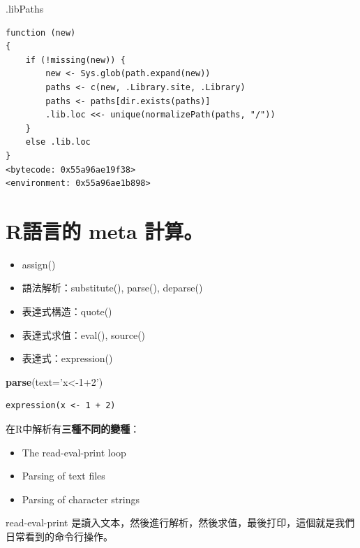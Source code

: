 \documentclass[]{book}
\newenvironment{Shaded}{\begin{snugshade}}{\end{snugshade}}
\newcommand{\DataTypeTok}[1]{\textcolor[rgb]{0.13,0.29,0.53}{#1}}
\newcommand{\KeywordTok}[1]{\textcolor[rgb]{0.13,0.29,0.53}{\textbf{#1}}}
\newcommand{\NormalTok}[1]{#1}
\newcommand{\StringTok}[1]{\textcolor[rgb]{0.31,0.60,0.02}{#1}}
\providecommand{\tightlist}{%
  \setlength{\itemsep}{0pt}\setlength{\parskip}{0pt}}
\theoremstyle{definition}
\theoremstyle{definition}
\theoremstyle{definition}
\theoremstyle{remark}
\begin{document}
\begin{Shaded}
\begin{Highlighting}[]
\NormalTok{.libPaths}
\end{Highlighting}
\end{Shaded}

\begin{verbatim}
function (new) 
{
    if (!missing(new)) {
        new <- Sys.glob(path.expand(new))
        paths <- c(new, .Library.site, .Library)
        paths <- paths[dir.exists(paths)]
        .lib.loc <<- unique(normalizePath(paths, "/"))
    }
    else .lib.loc
}
<bytecode: 0x55a96ae19f38>
<environment: 0x55a96ae1b898>
\end{verbatim}

\hypertarget{r-meta-}{%
\section{R語言的 meta 計算。}\label{r-meta-}}

\begin{itemize}
\tightlist
\item
  assign()
\item
  語法解析：substitute(), parse(), deparse()\\
\item
  表達式構造：quote()
\item
  表達式求值：eval(), source()
\item
  表達式：expression()
\end{itemize}

\begin{Shaded}
\begin{Highlighting}[]
\KeywordTok{parse}\NormalTok{(}\DataTypeTok{text=}\StringTok{'x<-1+2'}\NormalTok{)}
\end{Highlighting}
\end{Shaded}

\begin{verbatim}
expression(x <- 1 + 2)
\end{verbatim}

在R中解析有\textbf{三種不同的變種}：

\begin{itemize}
\tightlist
\item
  The read-eval-print loop
\item
  Parsing of text files
\item
  Parsing of character strings
\end{itemize}

read-eval-print
是讀入文本，然後進行解析，然後求值，最後打印，這個就是我們日常看到的命令行操作。
\end{document}
